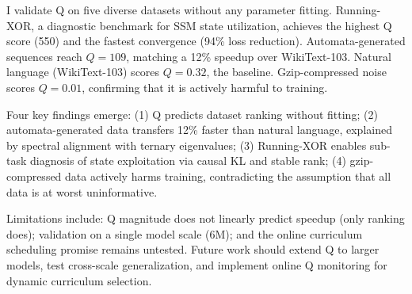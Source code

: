 \documentclass{article}
\begin{document}
I validate Q on five diverse datasets without any parameter fitting. Running-XOR, a diagnostic benchmark for SSM state utilization, achieves the highest Q score (550) and the fastest convergence (94\% loss reduction). Automata-generated sequences reach $Q = 109$, matching a 12\% speedup over WikiText-103. Natural language (WikiText-103) scores $Q = 0.32$, the baseline. Gzip-compressed noise scores $Q = 0.01$, confirming that it is actively harmful to training.

Four key findings emerge: (1) Q predicts dataset ranking without fitting; (2) automata-generated data transfers 12\% faster than natural language, explained by spectral alignment with ternary eigenvalues; (3) Running-XOR enables sub-task diagnosis of state exploitation via causal KL and stable rank; (4) gzip-compressed data actively harms training, contradicting the assumption that all data is at worst uninformative.

Limitations include: Q magnitude does not linearly predict speedup (only ranking does); validation on a single model scale (6M); and the online curriculum scheduling promise remains untested. Future work should extend Q to larger models, test cross-scale generalization, and implement online Q monitoring for dynamic curriculum selection.



\end{document}

